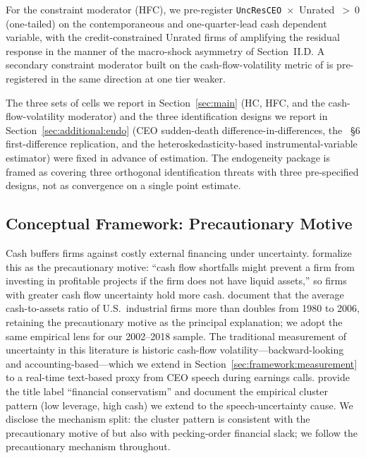 For the constraint moderator (HFC), we pre-register \texttt{UncResCEO}~$\times$~Unrated~$>~0$ (one-tailed) on the contemporaneous and one-quarter-lead cash dependent variable, with the credit-constrained Unrated firms of  amplifying the residual response in the manner of the macro-shock asymmetry of  Section~II.D. A secondary constraint moderator built on the cash-flow-volatility metric of  is pre-registered in the same direction at one tier weaker.

The three sets of cells we report in Section~\ref{sec:main} (HC, HFC, and the cash-flow-volatility moderator) and the three identification designs we report in Section~\ref{sec:additional:endo} (CEO sudden-death difference-in-differences, the \citeauthor{dzielinski2021}~\S6 first-difference replication, and the  heteroskedasticity-based instrumental-variable estimator) were fixed in advance of estimation. The endogeneity package is framed as covering three orthogonal identification threats with three pre-specified designs, not as convergence on a single point estimate.

\subsection{Conceptual Framework: Precautionary Motive}
\label{sec:framework:conceptual}

Cash buffers firms against costly external financing under uncertainty.  formalize this as the precautionary motive: ``cash flow shortfalls might prevent a firm from investing in profitable projects if the firm does not have liquid assets,'' so firms with greater cash flow uncertainty hold more cash.  document that the average cash-to-assets ratio of U.S.\ industrial firms more than doubles from 1980 to 2006, retaining the precautionary motive as the principal explanation; we adopt the same empirical lens for our 2002--2018 sample. The traditional measurement of uncertainty in this literature is historic cash-flow volatility---backward-looking and accounting-based---which we extend in Section~\ref{sec:framework:measurement} to a real-time text-based proxy from CEO speech during earnings calls.  provide the title label ``financial conservatism'' and document the empirical cluster pattern (low leverage, high cash) we extend to the speech-uncertainty cause. We disclose the mechanism split: the cluster pattern is consistent with the precautionary motive of \citeauthor{opler1999} but also with pecking-order financial slack; we follow the precautionary mechanism throughout.

